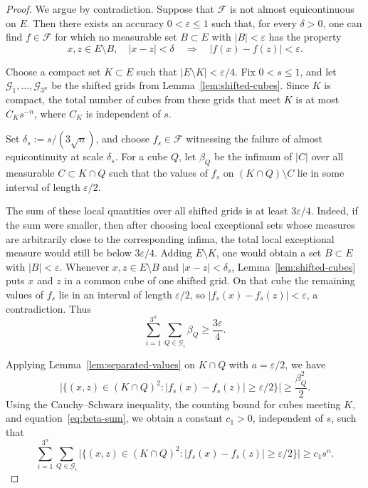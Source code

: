 \documentclass[11pt]{article}
\theoremstyle{plain}
\theoremstyle{definition}
\theoremstyle{remark}
\newcommand{\F}{\mathcal{F}}
\newcommand{\eps}{\varepsilon}
\newcommand{\meas}[1]{\lvert #1\rvert}
\begin{document}
\begin{proof}
We argue by contradiction. Suppose that $\F$ is not almost equicontinuous on
$E$. Then there exists an accuracy $0<\eps\le1$ such that, for every
$\delta>0$, one can find $f\in\F$ for which no measurable set
$B\subset E$ with $\meas{B}<\eps$ has the property
\[
    x,z\in E\setminus B,\quad |x-z|<\delta
    \quad\Longrightarrow\quad
    |f(x)-f(z)|<\eps .
\]

Choose a compact set $K\subset E$ such that
$\meas{E\setminus K}<\eps/4$. Fix $0<s\le1$, and let
$\mathcal G_1,\dots,\mathcal G_{3^n}$ be the shifted grids from
Lemma~\ref{lem:shifted-cubes}. Since $K$ is compact, the total number of
cubes from these grids that meet $K$ is at most $C_Ks^{-n}$, where $C_K$ is
independent of $s$.

Set $\delta_s:=s/(3\sqrt n)$, and choose $f_s\in\F$ witnessing the failure
of almost equicontinuity at scale $\delta_s$. For a cube $Q$, let
$\beta_Q$ be the infimum of $\meas{C}$ over all measurable
$C\subset K\cap Q$ such that the values of $f_s$ on
$(K\cap Q)\setminus C$ lie in some interval of length $\eps/2$.

The sum of these local quantities over all shifted grids is at least
$3\eps/4$. Indeed, if the sum were smaller, then after choosing local
exceptional sets whose measures are arbitrarily close to the corresponding
infima, the total local exceptional measure would still be below
$3\eps/4$. Adding $E\setminus K$, one would obtain a set $B\subset E$ with
$\meas{B}<\eps$.
Whenever $x,z\in E\setminus B$ and $|x-z|<\delta_s$,
Lemma~\ref{lem:shifted-cubes} puts $x$ and $z$ in a common cube of one
shifted grid. On that cube the remaining values of $f_s$ lie in an interval
of length $\eps/2$, so $|f_s(x)-f_s(z)|<\eps$, a contradiction. Thus
\begin{equation}\label{eq:beta-sum}
    \sum_{i=1}^{3^n}\sum_{Q\in\mathcal G_i}\beta_Q
    \ge \frac{3\eps}{4}.
\end{equation}

Applying Lemma~\ref{lem:separated-values} on $K\cap Q$ with
$a=\eps/2$, we have
\[
    \meas{\{(x,z)\in(K\cap Q)^2:
    |f_s(x)-f_s(z)|\ge\eps/2\}}
    \ge \frac{\beta_Q^2}{2}.
\]
Using the Cauchy--Schwarz inequality, the counting bound for cubes meeting
$K$, and equation~\eqref{eq:beta-sum}, we obtain a constant $c_1>0$,
independent of $s$, such that
\begin{equation}\label{eq:bad-pairs}
    \sum_{i=1}^{3^n}\sum_{Q\in\mathcal G_i}
    \meas{\{(x,z)\in(K\cap Q)^2:
    |f_s(x)-f_s(z)|\ge\eps/2\}}
    \ge c_1s^n .
\end{equation}


\end{proof}
\end{document}
